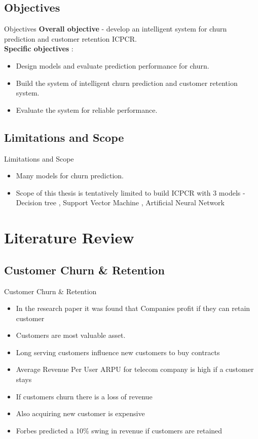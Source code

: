 \documentclass{beamer}
\begin{document}
\subsection{Objectives}
\begin{frame}{Objectives}
	\textbf{Overall objective} - develop an intelligent system for churn prediction and customer retention ICPCR.\\	
	\textbf{Specific objectives} :
	\begin{itemize}
		\item {
			Design models and evaluate prediction performance for churn.
		}
		\item {
			Build the system of intelligent churn prediction and customer retention system.
		}
		\item Evaluate the system for reliable performance.
	\end{itemize}
\end{frame}


\subsection{Limitations and Scope}
\begin{frame}{Limitations and Scope}
	\begin{itemize}
		\item {
			Many models for churn prediction.
		}
		\item Scope of this thesis is tentatively limited to build ICPCR with 3 models - Decision tree , Support Vector Machine , Artificial Neural Network
	\end{itemize}
\end{frame}

\section{Literature Review}
%

\subsection{Customer Churn \& Retention}
\begin{frame}{Customer Churn \& Retention}
	\begin{itemize}
		\item In the research paper it was found that Companies profit if they can retain customer
		\item Customers are most valuable asset.
		\item Long serving customers influence new customers to buy contracts
		\item Average Revenue Per User ARPU for telecom company is high if a customer stays
		\item If customers churn there is a loss of revenue
		\item Also acquiring new customer is expensive
		\item Forbes predicted a 10\% swing in revenue if customers are retained
	\end{itemize}
\end{frame}
\end{document}
